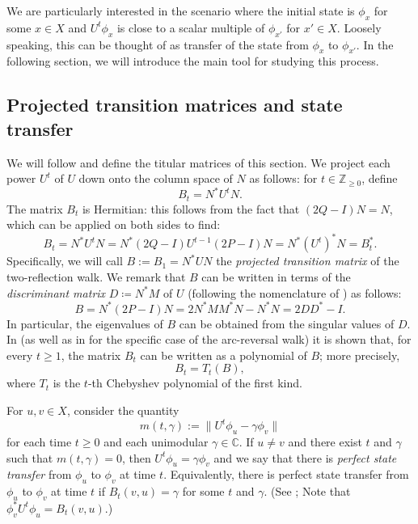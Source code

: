 \documentclass{article}
\numberwithin{equation}{section}
\newcommand\cx{{\mathbb C}}%
\newcommand\ints{{\mathbb Z}}
\begin{document}
We are particularly interested in the scenario where the initial state is $\phi_x$ for some $x\in X$ and $U^t\phi_x$ is close to a scalar multiple of $\phi_{x'}$ for $x' \in X$. Loosely speaking, this can be thought of as transfer of the state from $\phi_x$ to $\phi_{x'}$. In the following section, we will introduce the main tool for studying this process.








\subsection{Projected transition matrices and state transfer}\label{sec:prelim-projected}

We will follow \cite{GuoSch2024} and define the titular matrices of this section.
We  project each power $U^t$ of $U$ down onto the column space of $N$ as follows: for $t \in \ints_{\geq 0}$, define
\[
B_t = N^*U^tN.
\]
The matrix $B_t$ is Hermitian: this follows from the fact that $(2Q - I)N = N$, which can be applied on both sides to find:
\[
B_t = N^* U^t N = N^* (2Q - I)U^{t-1}(2P - I) N = N^* (U^t)^* N = B_t^*.
\]
Specifically, we will call $B := B_1 = N^* UN$ the \textsl{projected transition matrix} of the two-reflection walk. We remark that $B$ can be written in terms of the \textsl{discriminant matrix} $D \coloneq N^*M$ of $U$ (following the nomenclature of \cite{Sze2004}) as follows:
\[
B = N^* (2P - I)N = 2N^*MM^*N - N^*N = 2DD^* - I.
\]
In particular, the eigenvalues of $B$ can be obtained from the singular values of $D$.
In \cite{GuoSch2024} (as well as in \cite{KubSeg2022} for the specific case of the arc-reversal walk) it is shown that, for every $t\geq 1$, the matrix $B_t$ can be written as a polynomial of $B$; more precisely, 
\[
B_t = T_t(B),
\]
where $T_t$ is the $t$-th Chebyshev polynomial of the first kind.


For $u, v \in X$, consider the quantity
\[
m(t,\gamma) := \| U^t \phi_u - \gamma \phi_v \| 
\]
for each time $t \geq 0$ and each unimodular $\gamma \in \cx$. If $u \neq v$ and there exist $t$ and $\gamma$ such that $m(t,\gamma)=0$, then $U^t \phi_u = \gamma \phi_v$ and we say that there is \textsl{perfect state transfer} from $\phi_u$ to $\phi_v$ at time $t$. Equivalently, there is perfect state transfer from $\phi_u$ to $\phi_v$ at time $t$ if $B_t(v,u) = \gamma$ for some $t$ and $\gamma$. (See \cite{GuoSch2024}; Note that $\phi_v^* U^t \phi_u = B_t(v,u)$.)
\end{document}
